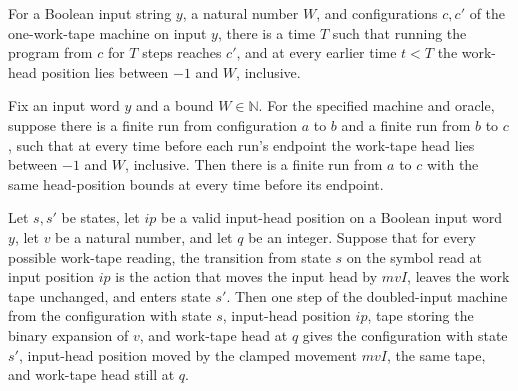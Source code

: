 \begin{definition}
\label{Complexity.LogProg.Dbl.Rch}
\leanok
{}
For a Boolean input string $y$, a natural number $W$, and configurations $c,c'$ of the
one-work-tape machine on input $y$, there is a time $T$ such that running the program
from $c$ for $T$ steps reaches $c'$, and at every earlier time $t<T$ the work-head
position lies between $-1$ and $W$, inclusive.
\end{definition}

\begin{lemma}
\label{Complexity.LogProg.Dbl.Rch.trans}
\leanok
{}
Fix an input word $y$ and a bound $W\in\mathbb{N}$. For the specified machine and
oracle, suppose there is a finite run from configuration $a$ to $b$ and a finite run
from $b$ to $c$, such that at every time before each run's endpoint the work-tape head
lies between $-1$ and $W$, inclusive. Then there is a finite run from $a$ to $c$ with
the same head-position bounds at every time before its endpoint.
\end{lemma}

\begin{lemma}
\label{Complexity.LogProg.Dbl.step_x}
\leanok
{}
Let $s,s'$ be states, let $ip$ be a valid input-head position on a Boolean input word
$y$, let $v$ be a natural number, and let $q$ be an integer. Suppose that for every
possible work-tape reading, the transition from state $s$ on the symbol read at input
position $ip$ is the action that moves the input head by $mvI$, leaves the work tape
unchanged, and enters state $s'$. Then one step of the doubled-input machine from the
configuration with state $s$, input-head position $ip$, tape storing the binary
expansion of $v$, and work-tape head at $q$ gives the configuration with state $s'$,
input-head position moved by the clamped movement $mvI$, the same tape, and work-tape
head still at $q$.
\end{lemma}

